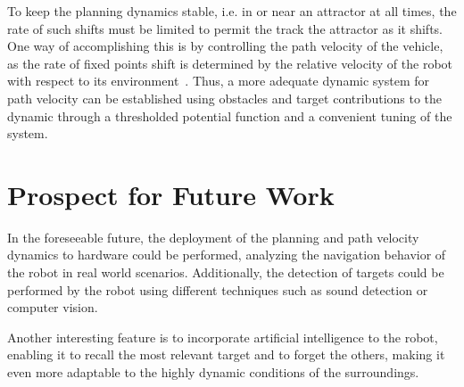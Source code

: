 To keep the planning dynamics stable, i.e. in or near an attractor at all times, the rate of such
shifts must be limited to permit the track the attractor as it shifts. One way
of accomplishing this is by controlling the path velocity of the vehicle, as the
rate of fixed points shift is determined by the relative velocity of the robot
with respect to its environment~\cite{bicho2000dynamic}. Thus, a more adequate
dynamic system for path velocity can be established using obstacles and target
contributions to the dynamic through a thresholded potential function and a
convenient tuning of the system.
%
\section{Prospect for Future Work}%
\label{ch:conclusion-future-work}
In the foreseeable future, the deployment of the planning and path velocity
dynamics to hardware could be performed, analyzing the navigation behavior of
the robot in real world scenarios. Additionally, the detection of targets could
be performed by the robot using different techniques such as sound detection or
computer vision.

Another interesting feature is to incorporate artificial intelligence to the
robot, enabling it to recall the most relevant target and to forget the others,
making it even more adaptable to the highly dynamic conditions of the surroundings. 
